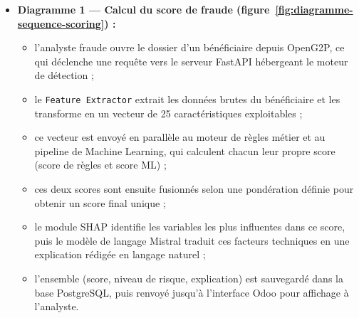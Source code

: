 \documentclass[a4paper, oneside, 12pt]{book}
\begin{document}
\begin{itemize}[label=\textbullet]

    \item \textbf{Diagramme 1 — Calcul du score de fraude (figure~\ref{fig:diagramme-sequence-scoring}) :}
    \begin{itemize}[label=\textendash]
        \item l'analyste fraude ouvre le dossier d'un bénéficiaire depuis OpenG2P, ce qui déclenche une requête vers le serveur FastAPI hébergeant le moteur de détection ;
        \item le \texttt{Feature Extractor} extrait les données brutes du bénéficiaire et les transforme en un vecteur de 25 caractéristiques exploitables ;
        \item ce vecteur est envoyé en parallèle au moteur de règles métier et au pipeline de Machine Learning, qui calculent chacun leur propre score (score de règles et score ML) ;
        \item ces deux scores sont ensuite fusionnés selon une pondération définie pour obtenir un score final unique ;
        \item le module SHAP identifie les variables les plus influentes dans ce score, puis le modèle de langage Mistral traduit ces facteurs techniques en une explication rédigée en langage naturel ;
        \item l'ensemble (score, niveau de risque, explication) est sauvegardé dans la base PostgreSQL, puis renvoyé jusqu'à l'interface Odoo pour affichage à l'analyste.
    \end{itemize}


\end{itemize}
\end{document}
